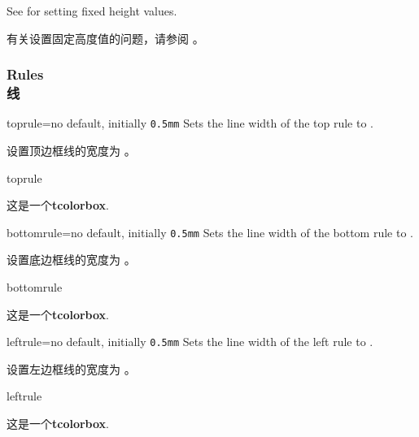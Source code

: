 See  for setting fixed height values.

有关设置固定高度值的问题，请参阅 。



\subsubsection{Rules\\线}
\begin{docTcbKey}{toprule}{=}{no default, initially \texttt{0.5mm}}
Sets the line width of the top rule to .

设置顶边框线的宽度为 。
\begin{exdispExample}{toprule}

\begin{tcolorbox}[toprule=3mm]
这是一个\textbf{tcolorbox}.
\end{tcolorbox}
\end{exdispExample}
\end{docTcbKey}


\begin{docTcbKey}{bottomrule}{=}{no default, initially \texttt{0.5mm}}
Sets the line width of the bottom rule to .

设置底边框线的宽度为 。
\begin{exdispExample}{bottomrule}

\begin{tcolorbox}[bottomrule=3mm]
这是一个\textbf{tcolorbox}.
\end{tcolorbox}
\end{exdispExample}
\end{docTcbKey}

\begin{docTcbKey}{leftrule}{=}{no default, initially \texttt{0.5mm}}
Sets the line width of the left rule to .

设置左边框线的宽度为 。
\begin{exdispExample}{leftrule}

\begin{tcolorbox}[leftrule=3mm]
这是一个\textbf{tcolorbox}.
\end{tcolorbox}
\end{exdispExample}
\end{docTcbKey}


